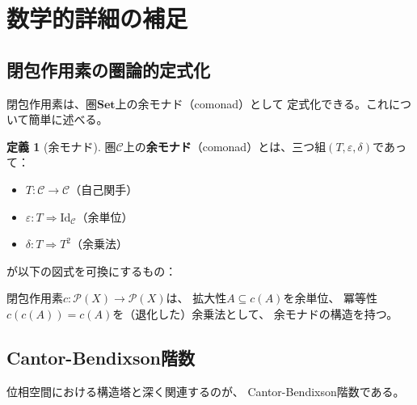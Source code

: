 \documentclass[a4paper,12pt]{ltjsarticle}
\theoremstyle{definition}
\newtheorem{definition}{定義}[section]
\begin{document}
\section{数学的詳細の補足}

\subsection{閉包作用素の圏論的定式化}

閉包作用素は、圏$\mathbf{Set}$上の余モナド（comonad）として
定式化できる。これについて簡単に述べる。

\begin{definition}[余モナド]
圏$\mathcal{C}$上の\textbf{余モナド}（comonad）とは、三つ組$(T, \varepsilon, \delta)$であって：
\begin{itemize}
\item $T: \mathcal{C} \to \mathcal{C}$（自己関手）
\item $\varepsilon: T \Rightarrow \mathrm{Id}_{\mathcal{C}}$（余単位）
\item $\delta: T \Rightarrow T^2$（余乗法）
\end{itemize}
が以下の図式を可換にするもの：

\quad
{}
\quad
{}
\end{definition}

閉包作用素$c: \mathcal{P}(X) \to \mathcal{P}(X)$は、
拡大性$A \subseteq c(A)$を余単位、
冪等性$c(c(A)) = c(A)$を（退化した）余乗法として、
余モナドの構造を持つ。

\subsection{Cantor-Bendixson階数}

位相空間における構造塔と深く関連するのが、
Cantor-Bendixson階数である。
\end{document}
